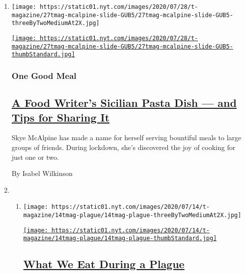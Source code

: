 \begin{enumerate}
\def\labelenumi{\arabic{enumi}.}
\item
  \texttt{[image: https://static01.nyt.com/images/2020/07/28/t-magazine/27tmag-mcalpine-slide-GUB5/27tmag-mcalpine-slide-GUB5-threeByTwoMediumAt2X.jpg]}

  \href{/2020/07/29/t-magazine/skye-mcalpine-pasta-cooking.html}{\texttt{[image: https://static01.nyt.com/images/2020/07/28/t-magazine/27tmag-mcalpine-slide-GUB5/27tmag-mcalpine-slide-GUB5-thumbStandard.jpg]}}

  \hypertarget{one-good-meal}{%
  \subsubsection{One Good Meal}\label{one-good-meal}}

  \hypertarget{a-food-writers-sicilian-pasta-dish--and-tips-for-sharing-it}{%
  \subsection{\texorpdfstring{\href{/2020/07/29/t-magazine/skye-mcalpine-pasta-cooking.html}{A
  Food Writer's Sicilian Pasta Dish --- and Tips for Sharing
  It}}{A Food Writer's Sicilian Pasta Dish --- and Tips for Sharing It}}\label{a-food-writers-sicilian-pasta-dish--and-tips-for-sharing-it}}

  Skye McAlpine has made a name for herself serving bountiful meals to
  large groups of friends. During lockdown, she's discovered the joy of
  cooking for just one or two.

  By Isabel Wilkinson
\item
  \begin{enumerate}
  \def\labelenumii{\arabic{enumii}.}
  \item
    \texttt{[image: https://static01.nyt.com/images/2020/07/14/t-magazine/14tmag-plague/14tmag-plague-threeByTwoMediumAt2X.jpg]}

    \href{/2020/07/16/t-magazine/eating-food-during-plague.html}{\texttt{[image: https://static01.nyt.com/images/2020/07/14/t-magazine/14tmag-plague/14tmag-plague-thumbStandard.jpg]}}

    \hypertarget{what-we-eat-during-a-plague}{%
    \subsection{\texorpdfstring{\href{/2020/07/16/t-magazine/eating-food-during-plague.html}{What
    We Eat During a
    Plague}}{What We Eat During a Plague}}\label{what-we-eat-during-a-plague}}


\end{enumerate}
\end{enumerate}
